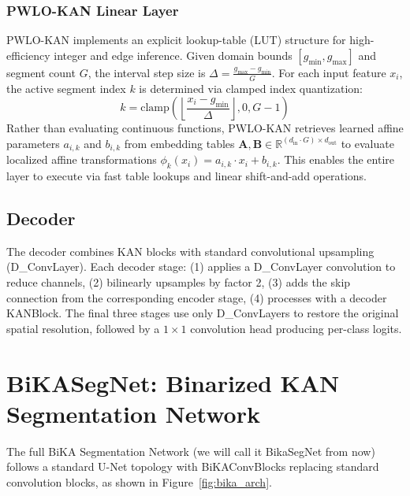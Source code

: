 \documentclass[a4paper]{report}
\begin{document}
\subsubsection{PWLO-KAN Linear Layer}
PWLO-KAN implements an explicit lookup-table (LUT) structure for high-efficiency integer and edge inference. Given domain bounds $[g_{\min}, g_{\max}]$ and segment count $G$, the interval step size is $\Delta = \frac{g_{\max} - g_{\min}}{G}$. For each input feature $x_i$, the active segment index $k$ is determined via clamped index quantization:
\begin{equation}
    k = \text{clamp}\left(\left\lfloor \frac{x_i - g_{\min}}{\Delta} \right\rfloor, 0, G-1\right)
\end{equation}
Rather than evaluating continuous functions, PWLO-KAN retrieves learned affine parameters $a_{i,k}$ and $b_{i,k}$ from embedding tables $\mathbf{A}, \mathbf{B} \in \mathbb{R}^{(d_{\text{in}} \cdot G) \times d_{\text{out}}}$ to evaluate localized affine transformations $\phi_k(x_i) = a_{i,k} \cdot x_i + b_{i,k}$. This enables the entire layer to execute via fast table lookups and linear shift-and-add operations.

\subsection{Decoder}
The decoder combines KAN blocks with standard convolutional upsampling (D\_ConvLayer). Each decoder stage: (1) applies a D\_ConvLayer convolution to reduce channels, (2) bilinearly upsamples by factor 2, (3) adds the skip connection from the corresponding encoder stage, (4) processes with a decoder KANBlock. The final three stages use only D\_ConvLayers to restore the original spatial resolution, followed by a $1\times1$ convolution head producing per-class logits.


\section{BiKASegNet: Binarized KAN Segmentation Network}
\label{sec:bika_arch}
The full BiKA Segmentation Network (we will call it BikaSegNet from now) follows a standard U-Net topology with BiKAConvBlocks replacing standard convolution blocks, as shown in Figure~\ref{fig:bika_arch}.
\end{document}
